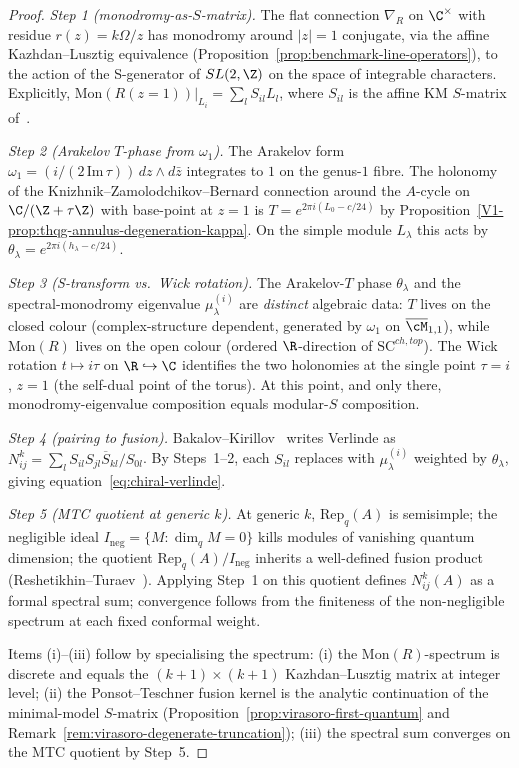 \begin{proof}
\emph{Step 1 (monodromy-as-$S$-matrix).}
The flat connection $\nabla_R$ on $\C^\times$ with residue
$r(z) = k \Omega/z$ has monodromy around $|z|=1$ conjugate, via the
affine Kazhdan--Lusztig equivalence
(Proposition~\ref{prop:benchmark-line-operators}), to the action of
the S-generator of $SL(2,\Z)$ on the space of integrable
characters. Explicitly,
$\mathrm{Mon}(R(z=1))|_{L_i} = \sum_l S_{il} L_l$,
where $S_{il}$ is the affine KM $S$-matrix of~\cite{BK01,KL93}.

\emph{Step 2 (Arakelov $T$-phase from $\omega_1$).}
The Arakelov form
$\omega_1 = (i/(2\,\mathrm{Im}\,\tau))\, dz \wedge d\bar z$
integrates to $1$ on the genus-$1$ fibre. The holonomy
of the Knizhnik--Zamolodchikov--Bernard connection around the
$A$-cycle on $\C/(\Z+\tau\Z)$ with base-point at
$z=1$ is $T = e^{2\pi i (L_0 - c/24)}$ by
Proposition~\textup{\ref*{V1-prop:thqg-annulus-degeneration-kappa}}.
On the simple module $L_\lambda$ this acts by $\theta_\lambda =
e^{2\pi i (h_\lambda - c/24)}$.

\emph{Step 3 (S-transform vs.~Wick rotation).}
The Arakelov-$T$ phase $\theta_\lambda$ and the
spectral-monodromy eigenvalue $\mu^{(i)}_\lambda$ are
\emph{distinct} algebraic data: $T$ lives on the closed colour
(complex-structure dependent, generated by $\omega_1$ on
$\overline{\cM}_{1,1}$), while $\mathrm{Mon}(R)$ lives on the
open colour (ordered $\R$-direction of
$\mathrm{SC}^{ch,top}$). The Wick rotation $t \mapsto i\tau$ on
$\R \hookrightarrow \C$ identifies the two holonomies at the
single point $\tau = i$, $z=1$ (the self-dual point of the
torus). At this point, and only there, monodromy-eigenvalue
composition equals modular-$S$ composition.

\emph{Step 4 (pairing to fusion).}
Bakalov--Kirillov~\cite[Thm 3.1.16]{BK01} writes Verlinde as
$N^k_{ij} = \sum_l S_{il} S_{jl} \overline{S}_{kl}/S_{0l}$. By
Steps~1--2, each $S_{il}$ replaces with
$\mu^{(i)}_\lambda$ weighted by $\theta_\lambda$, giving
equation~\eqref{eq:chiral-verlinde}.

\emph{Step 5 (MTC quotient at generic $k$).}
At generic $k$, $\mathrm{Rep}_q(A)$ is semisimple; the
negligible ideal $I_{\mathrm{neg}} = \{M :
\dim_q M = 0\}$ kills modules of vanishing quantum dimension;
the quotient $\mathrm{Rep}_q(A)/I_{\mathrm{neg}}$ inherits a
well-defined fusion product
(Reshetikhin--Turaev~\cite[Ch.~XII]{Tur94}). Applying Step~1 on
this quotient defines $N^k_{ij}(A)$ as a formal spectral sum;
convergence follows from the finiteness of the non-negligible
spectrum at each fixed conformal weight.

Items (i)--(iii) follow by specialising the spectrum:
(i) the $\mathrm{Mon}(R)$-spectrum is discrete and equals the
$(k{+}1) \times (k{+}1)$ Kazhdan--Lusztig matrix at integer
level; (ii) the Ponsot--Teschner fusion kernel is the
analytic continuation of the minimal-model $S$-matrix
(Proposition~\ref{prop:virasoro-first-quantum} and
Remark~\ref{rem:virasoro-degenerate-truncation}); (iii) the spectral
sum converges on the MTC quotient by Step~5.
\end{proof}

